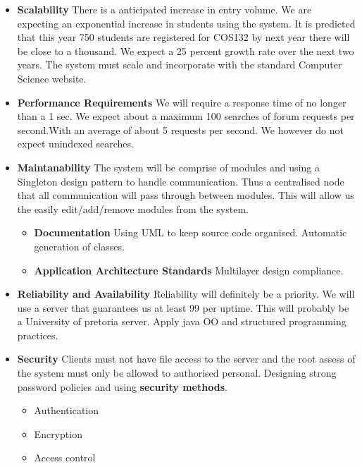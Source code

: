 
%

\begin{itemize}
	\item \textbf{Scalability}
		There is a anticipated increase in entry volume. We are expecting an exponential increase in students using the system. It is predicted that this year 750 students are registered for COS132 by next year there will be close to a thousand. We expect a 25 percent growth rate over the next two years. The system must scale and incorporate with the standard Computer Science website. 
	\item \textbf{Performance Requirements}
		We will require a response time of no longer than a 1 sec. We expect about a maximum 100 searches of forum requests per second.With an average of about 5 requests per second. We however do not expect unindexed searches.
	\item \textbf{Maintanability}
		The system will be comprise of modules and using a Singleton design pattern to handle communication. Thus a centralised node that all communication will pass through between modules. This will allow us the easily edit/add/remove modules from the system.
		\begin{itemize}
			\item \textbf{Documentation}
				Using UML to keep source code organised. Automatic generation of classes.
			\item \textbf{Application Architecture Standards}
				Multilayer design compliance.
		\end{itemize}
	\item \textbf{Reliability and Availability}
		Reliability will definitely be a priority. We will use a server that guarantees us at least 99 per uptime. This will probably be a University of pretoria server. Apply java OO and structured programming practices.
	\item \textbf{Security}
		Clients must not have file access to the server and the root assess of the system must only be allowed to authorised personal. Designing strong password policies and using \textbf{security methods}.
		\begin{itemize}
			\item Authentication
			\item Encryption
			\item Access control

\end{itemize}
\end{itemize}
